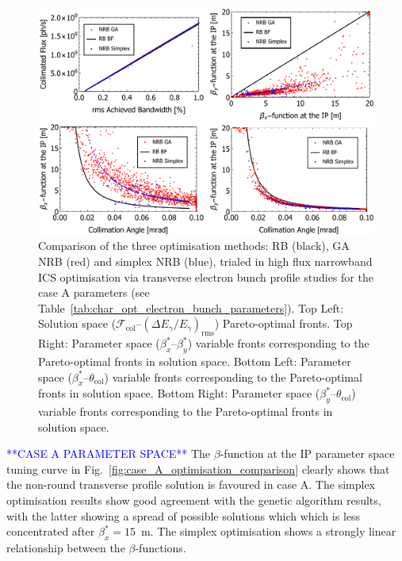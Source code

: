 \documentclass[../main.tex]{subfiles}
\begin{document}
\begin{figure}[!h]
\centering
\includegraphics[width=\textwidth]{Figures/Optimisation_and_Characterisation_of_Inverse_Compton_Scattering_Sources/CaseAoptcomp.pdf}
\caption{Comparison of the three optimisation methods: RB (black), GA NRB (red) and simplex NRB (blue), trialed in high flux narrowband ICS optimisation via transverse electron bunch profile studies for the case A parameters (see Table~\ref{tab:char_opt_electron_bunch_parameters}). Top Left: Solution space ($\mathcal{F}_{\mathrm{col}}$--$\left(\Delta E_{\gamma}/E_{\gamma}\right)_{\mathrm{rms}}$) Pareto-optimal fronts. Top Right: Parameter space ($\beta_{x}^{*}$--$\beta_{y}^{*}$) variable fronts corresponding to the Pareto-optimal fronts in solution space. Bottom Left: Parameter space ($\beta_{x}^{*}$--$\theta_{\mathrm{col}}$) variable fronts corresponding to the Pareto-optimal fronts in solution space. Bottom Right: Parameter space ($\beta_{y}^{*}$--$\theta_{\mathrm{col}}$) variable fronts corresponding to the Pareto-optimal fronts in solution space.}
\label{eq:case_A_optimisation_comparison}
\end{figure}

\textcolor{blue}{**CASE A PARAMETER SPACE**}
The $\beta$-function at the IP parameter space tuning curve in Fig.~\ref{fig:case_A_optimisation_comparison} clearly shows that the non-round transverse profile solution is favoured in case A. The simplex optimisation results show good agreement with the genetic algorithm results, with the latter showing a spread of possible solutions which which is less concentrated after $\beta_{x}^{*} = 15$~\si{\meter}. The simplex optimisation shows a strongly linear relationship between the $\beta$-functions. 
\end{document}
